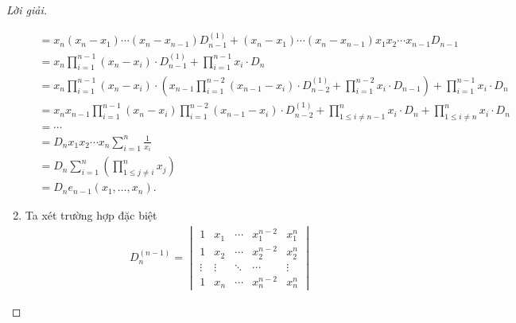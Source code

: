 \documentclass[class=nhvh-linear-algebra,crop=false]{standalone}
\begin{document}
\begin{proof}[Lời giải]
\begin{enumerate}[label = (\alph*)]
\begin{align*}
			                  & = x_{n}(x_{n} - x_{1})\cdots(x_{n} - x_{n-1})D^{(1)}_{n-1} + (x_{n} - x_{1})\cdots (x_{n} - x_{n-1}) x_{1}x_{2}\cdots x_{n-1}D_{n-1}                                                               \\
			                  & = x_{n}\prod^{n-1}_{i=1}(x_{n} - x_{i}) \cdot D^{(1)}_{n-1} + \prod^{n-1}_{i=1}x_{i} \cdot D_{n}                                                                                                   \\
			                  & = x_{n}\prod^{n-1}_{i=1}(x_{n} - x_{i}) \cdot \left(x_{n-1}\prod^{n-2}_{i=1}(x_{n-1} - x_{i})\cdot D^{(1)}_{n-2} + \prod^{n-2}_{i=1}x_{i}\cdot D_{n-1}\right) + \prod^{n-1}_{i=1}x_{i} \cdot D_{n} \\
			                  & = x_{n}x_{n-1}\prod^{n-1}_{i=1}(x_{n} - x_{i})\prod^{n-2}_{i=1}(x_{n-1} - x_{i})\cdot D^{(1)}_{n-2} + \prod^{n}_{1\le i\ne n-1}x_{i}\cdot D_{n} + \prod^{n}_{1\le i\ne n}x_{i}\cdot D_{n}          \\
			                  & = \cdots                                                                                                                                                                                           \\
			                  & = D_{n}x_{1}x_{2}\cdots x_{n}\sum^{n}_{i=1}\frac{1}{x_{i}}                                                                                                                                         \\
			                  & = D_{n}\sum^{n}_{i=1}\left(\prod^{n}_{1\le j\ne i}x_{j}\right)                                                                                                                                     \\
			                  & = D_{n}e_{n-1}(x_{1},\ldots, x_{n}).
		      \end{align*}
		      \endgroup{}
		\item
		      \par Ta xét trường hợp đặc biệt
		      \begin{align*}
			       & D^{(n-1)}_{n} =
			      \begin{vmatrix}
				      1      & x_{1}  & \cdots & x_{1}^{n-2} & x_{1}^{n} \\
				      1      & x_{2}  & \cdots & x_{2}^{n-2} & x_{2}^{n} \\
				      \vdots & \vdots & \ddots & \cdots      & \vdots    \\
				      1      & x_{n}  & \cdots & x_{n}^{n-2} & x_{n}^{n}

\end{vmatrix}
\end{align*}
\end{enumerate}
\end{proof}
\end{document}

